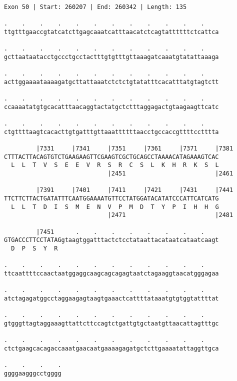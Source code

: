 \documentclass{article}
\begin{document}
\begin{Verbatim}
Exon 50 | Start: 260207 | End: 260342 | Length: 135
 
.    .    .    .    .    .    .    .    .    .    .    .    
ttgtttgaaccgtatcatcttgagcaaatcatttaacatctcagtattttttctcattca
  
.    .    .    .    .    .    .    .    .    .    .    .    
gcttaataatacctgccctgcctactttgtgtttgttaaagatcaaatgtatattaaaga
  
.    .    .    .    .    .    .    .    .    .    .    .    
acttggaaaataaaagatgcttattaaatctctctgtatatttcacatttatgtagtctt
  
.    .    .    .    .    .    .    .    .    .    .    .    
ccaaaatatgtgcacatttaacaggtactatgctctttaggagactgtaagaagttcatc
  
.    .    .    .    .    .    .    .    .    .    .    .    
ctgttttaagtcacacttgtgatttgttaaattttttaacctgccaccgttttcctttta
  
         |7331     |7341     |7351     |7361     |7371     |7381
CTTTACTTACAGTGTCTGAAGAAGTTCGAAGTCGCTGCAGCCTAAAACATAGAAAGTCAC
  L  L  T  V  S  E  E  V  R  S  R  C  S  L  K  H  R  K  S  L
                             |2451                         |2461
  
         |7391     |7401     |7411     |7421     |7431     |7441
TTCTTCTTACTGATATTTCAATGGAAAATGTTCCTATGGATACATATCCCATTCATCATG
  L  L  T  D  I  S  M  E  N  V  P  M  D  T  Y  P  I  H  H  G
                             |2471                         |2481
  
         |7451      .    .    .    .    .    .    .    .    
GTGACCCTTCCTATAGgtaagtggatttactctcctataattacataatcataatcaagt
  D  P  S  Y  R                                             
  
.    .    .    .    .    .    .    .    .    .    .    .    
ttcaattttccaactaatggaggcaagcagcagagtaatctagaaggtaacatgggagaa
  
.    .    .    .    .    .    .    .    .    .    .    .    
atctagagatggcctaggaagagtaagtgaaactcattttataaatgtgtggtattttat
  
.    .    .    .    .    .    .    .    .    .    .    .    
gtgggttagtaggaaagttattcttccagtctgattgtgctaatgttaacattagtttgc
  
.    .    .    .    .    .    .    .    .    .    .    .    
ctctgaagcacagaccaaatgaacaatgaaaagagatgctcttgaaaatattaggttgca
  
.    .    .    .
ggggaagggcctgggg
\end{Verbatim}
\newpage
\end{document}

